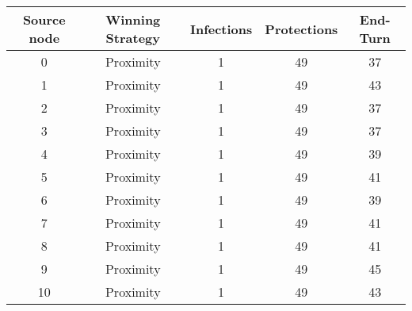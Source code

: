 \documentclass[results.tex]{subfiles}
\begin{document}
    \begin{center}
        \begin{tabular}{| c || c | c | c | c |}
            \hline
            {\bfseries Source node} & {\bfseries Winning Strategy} & {\bfseries Infections} & {\bfseries Protections}
            & {\bfseries End-Turn}
            \\  %
            \hline\hline
            0                       & Proximity                    & 1                      & 49                      & 37                   \\
            \hline
            1                       & Proximity                    & 1                      & 49                      & 43                   \\
            \hline
            2                       & Proximity                    & 1                      & 49                      & 37                   \\
            \hline
            3                       & Proximity                    & 1                      & 49                      & 37                   \\
            \hline
            4                       & Proximity                    & 1                      & 49                      & 39                   \\
            \hline
            5                       & Proximity                    & 1                      & 49                      & 41                   \\
            \hline
            6                       & Proximity                    & 1                      & 49                      & 39                   \\
            \hline
            7                       & Proximity                    & 1                      & 49                      & 41                   \\
            \hline
            8                       & Proximity                    & 1                      & 49                      & 41                   \\
            \hline
            9                       & Proximity                    & 1                      & 49                      & 45                   \\
            \hline
            10                      & Proximity                    & 1                      & 49                      & 43                   \\

\end{tabular}
\end{center}
\end{document}
